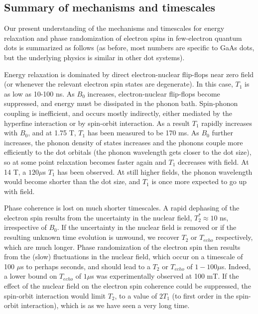 \documentclass[12pt,aps,nofootinbib]{revtex4-1}
\begin{document}
\subsection{Summary of mechanisms and timescales}

Our present understanding of the mechanisms and timescales for
energy relaxation and phase randomization of electron spins in
few-electron quantum dots is summarized as follows (as before, most numbers are specific to GaAs dots, but the underlying physics is similar in other dot systems).

Energy relaxation is dominated by direct electron-nuclear
flip-flops near zero field (or whenever the relevant electron spin
states are degenerate). In this case, $T_1$ is as low as 10-100
ns. As $B_0$ increases, electron-nuclear flip-flops become
suppressed, and energy must be dissipated in the phonon bath. Spin-phonon coupling is inefficient, and occurs mostly indirectly, either mediated by the hyperfine interaction or by spin-orbit interaction. As a result $T_1$ rapidly increases with $B_0$, and at 1.75 T, $T_1$ has been measured to be 170 ms. As $B_0$ further increases, the phonon density of states
increases and the phonons couple more efficiently to the dot
orbitals (the phonon wavelength gets closer to the dot size), so
at some point relaxation becomes faster again and $T_1$ decreases with field. At 14 T, a $120 \mu$s $T_1$ has been observed. At still higher fields, the phonon wavelength would become shorter than the dot size, and $T_1$ is once more expected to go up with field.

Phase coherence is lost on much shorter timescales. A rapid dephasing of the electron spin results from the
uncertainty in the nuclear field, $T_2^*\approx 10$ ns, irrespective of
$B_0$. If the uncertainty in the nuclear field is removed or if
the resulting unknown time evolution is unwound, we recover $T_2$ or $T_{echo}$ respectively, which are much longer. Phase randomization of the electron spin then results from the (slow) fluctuations in the nuclear field, which occur on a timescale of 100 $\mu$s to perhaps seconds, and should lead to a $T_2$ or $T_{echo}$ of $1-100 \mu$s. Indeed, a lower bound on $T_{echo}$ of $1 \mu$s was experimentally observed at 100 mT. If the effect of the nuclear field on the electron spin coherence could be suppressed, the spin-orbit interaction would limit $T_2$, to a value of $2T_1$ (to first order in the spin-orbit interaction), which is as we have seen a very long time.

\end{document}
